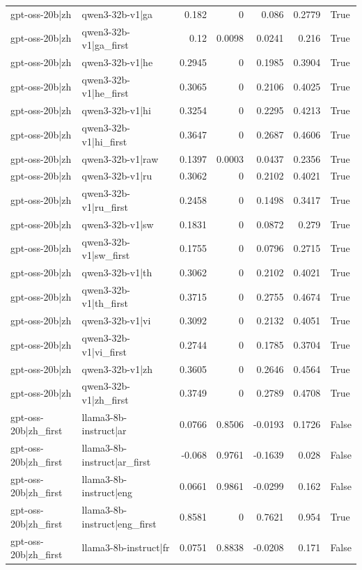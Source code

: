 \begin{table}
\begin{tabular}{l l r r r r l}
gpt-oss-20b|zh & qwen3-32b-v1|ga & 0.182 & 0 & 0.086 & 0.2779 & True \\
gpt-oss-20b|zh & qwen3-32b-v1|ga_first & 0.12 & 0.0098 & 0.0241 & 0.216 & True \\
gpt-oss-20b|zh & qwen3-32b-v1|he & 0.2945 & 0 & 0.1985 & 0.3904 & True \\
gpt-oss-20b|zh & qwen3-32b-v1|he_first & 0.3065 & 0 & 0.2106 & 0.4025 & True \\
gpt-oss-20b|zh & qwen3-32b-v1|hi & 0.3254 & 0 & 0.2295 & 0.4213 & True \\
gpt-oss-20b|zh & qwen3-32b-v1|hi_first & 0.3647 & 0 & 0.2687 & 0.4606 & True \\
gpt-oss-20b|zh & qwen3-32b-v1|raw & 0.1397 & 0.0003 & 0.0437 & 0.2356 & True \\
gpt-oss-20b|zh & qwen3-32b-v1|ru & 0.3062 & 0 & 0.2102 & 0.4021 & True \\
gpt-oss-20b|zh & qwen3-32b-v1|ru_first & 0.2458 & 0 & 0.1498 & 0.3417 & True \\
gpt-oss-20b|zh & qwen3-32b-v1|sw & 0.1831 & 0 & 0.0872 & 0.279 & True \\
gpt-oss-20b|zh & qwen3-32b-v1|sw_first & 0.1755 & 0 & 0.0796 & 0.2715 & True \\
gpt-oss-20b|zh & qwen3-32b-v1|th & 0.3062 & 0 & 0.2102 & 0.4021 & True \\
gpt-oss-20b|zh & qwen3-32b-v1|th_first & 0.3715 & 0 & 0.2755 & 0.4674 & True \\
gpt-oss-20b|zh & qwen3-32b-v1|vi & 0.3092 & 0 & 0.2132 & 0.4051 & True \\
gpt-oss-20b|zh & qwen3-32b-v1|vi_first & 0.2744 & 0 & 0.1785 & 0.3704 & True \\
gpt-oss-20b|zh & qwen3-32b-v1|zh & 0.3605 & 0 & 0.2646 & 0.4564 & True \\
gpt-oss-20b|zh & qwen3-32b-v1|zh_first & 0.3749 & 0 & 0.2789 & 0.4708 & True \\
gpt-oss-20b|zh_first & llama3-8b-instruct|ar & 0.0766 & 0.8506 & -0.0193 & 0.1726 & False \\
gpt-oss-20b|zh_first & llama3-8b-instruct|ar_first & -0.068 & 0.9761 & -0.1639 & 0.028 & False \\
gpt-oss-20b|zh_first & llama3-8b-instruct|eng & 0.0661 & 0.9861 & -0.0299 & 0.162 & False \\
gpt-oss-20b|zh_first & llama3-8b-instruct|eng_first & 0.8581 & 0 & 0.7621 & 0.954 & True \\
gpt-oss-20b|zh_first & llama3-8b-instruct|fr & 0.0751 & 0.8838 & -0.0208 & 0.171 & False \\

\end{tabular}
\end{table}

